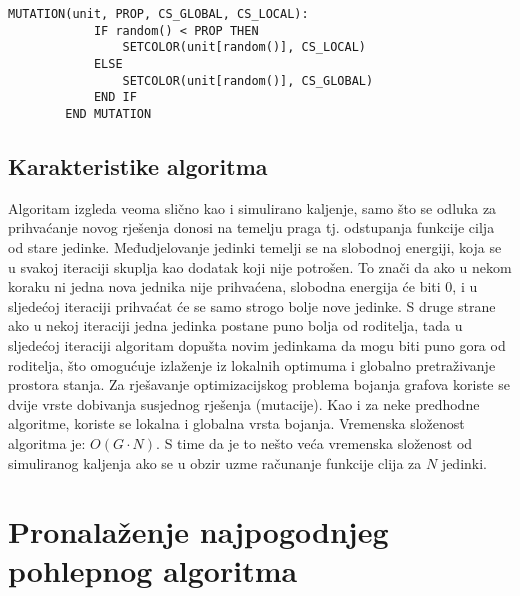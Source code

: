 \documentclass[times, utf8, diplomski, numeric]{fer}
\begin{document}
\begin{singlespace}
	\begin{lstlisting}[caption=Pseudok\^{o}d mutacije genetskog kaljenja]
		MUTATION(unit, PROP, CS_GLOBAL, CS_LOCAL):
			IF random() < PROP THEN
				SETCOLOR(unit[random()], CS_LOCAL)				
			ELSE
				SETCOLOR(unit[random()], CS_GLOBAL)
			END IF
		END MUTATION
	\end{lstlisting}
\end{singlespace}


\subsection{Karakteristike algoritma}

Algoritam izgleda veoma slično kao i simulirano kaljenje, samo što se odluka za prihvaćanje novog rješenja donosi na temelju praga tj. odstupanja funkcije cilja od stare jedinke. Međudjelovanje jedinki temelji se na slobodnoj energiji, koja se u svakoj iteraciji skuplja kao dodatak koji nije potrošen. To znači da ako u nekom koraku ni jedna nova jednika nije prihvaćena, slobodna energija će biti $0$, i u sljedećoj iteraciji prihvaćat će se samo strogo bolje nove jedinke. S druge strane ako u nekoj iteraciji jedna jedinka postane puno bolja od roditelja, tada u sljedećoj iteraciji algoritam dopušta novim jedinkama da mogu biti puno gora od roditelja, što omogućuje izlaženje iz lokalnih optimuma i globalno pretraživanje prostora stanja. Za rješavanje optimizacijskog problema bojanja grafova koriste se dvije vrste dobivanja susjednog rješenja (mutacije). Kao i za neke predhodne algoritme, koriste se lokalna i globalna vrsta bojanja.  
Vremenska složenost algoritma je: $O(G \cdot N)$. S time da je to nešto veća vremenska složenost od simuliranog kaljenja ako se u obzir uzme računanje funkcije clija za $N$ jedinki.

\section{Pronalaženje najpogodnjeg pohlepnog algoritma}
\end{document}
